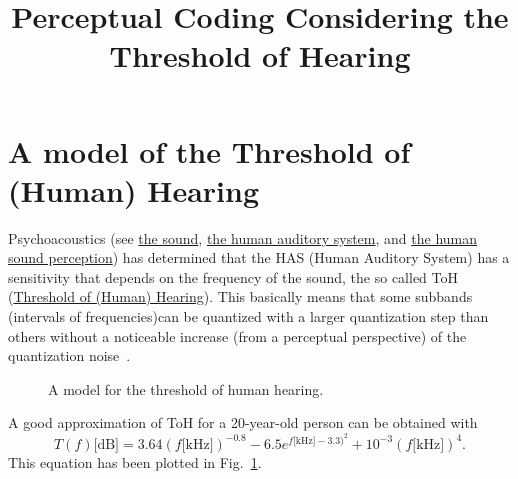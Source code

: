 
\title{Perceptual Coding Considering the Threshold of Hearing}

\maketitle
\tableofcontents

\section{A model of the Threshold of (Human) Hearing}

Psychoacoustics (see
\href{https://vicente-gonzalez-ruiz.github.io/the_sound/}{the sound},
\href{https://vicente-gonzalez-ruiz.github.io/human_auditory_system/}{the
  human auditory system}, and
\href{https://vicente-gonzalez-ruiz.github.io/human_sound_perception/}{the
  human sound perception}) has determined that the HAS (Human Auditory
System) has a sensitivity that depends on the frequency of the sound,
the so called ToH
(\href{https://en.wikipedia.org/wiki/Absolute_threshold_of_hearing}{Threshold
  of (Human) Hearing}). This basically means that some subbands (intervals of frequencies)can be
quantized with a larger quantization step than others without a
noticeable increase (from a perceptual perspective) of the
quantization noise~\cite{sayood2017introduction}.

\begin{figure}
  \centering
  \caption{A model for the threshold of human hearing.}
  \label{fig:ToHH}
\end{figure}

A good approximation of ToH for a 20-year-old person can be
obtained with~\cite{bosi2003intro}
\begin{equation}
  T(f)\text{[dB]} = 3.64(f\text{[kHz]})^{-0.8} - 6.5e^{f\text{[kHz]}-3.3)^2} + 10^{-3}(f\text{[kHz]})^4.
  \label{eq:ToHH}
\end{equation}
This equation has been plotted in Fig.~\ref{fig:ToHH}.

